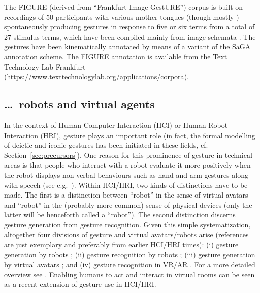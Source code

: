 \documentclass[output=paper,biblatex,babelshorthands,newtxmath,draftmode,colorlinks,citecolor=brown]{langscibook}
\begin{document}
The FIGURE (derived from \enquote{Frankfurt Image GestURE}) corpus \citep{Luecking:Mehler:Walther:Mauri:Kurfuerst:2016} is built on recordings of 50 participants with various mother tongues (though mostly ) spontaneously producing gestures in response to five or six terms from a total of 27 stimulus terms, which have been compiled mainly from image schemata \citep[]{Lakoff87a-u}.
%
The gestures have been kinematically annotated by means of a variant of the SaGA annotation scheme.
%
The FIGURE annotation is available from the Text Technology Lab Frankfurt (\url{https://www.texttechnologylab.org/applications/corpora}).



\subsection{\ldots\ robots and virtual agents}
\label{sec:virtual-agents}

\largerpage
In the context of Human-Computer Interaction (HCI) or Human-Robot Interaction (HRI), gesture plays an important role (in fact, the formal modelling of deictic and iconic gestures has been initiated in these fields, cf. Section~\ref{sec:precursors}).
%
One reason for this prominence of gesture in technical areas is that people who interact with a robot evaluate it more positively when the robot displays non-verbal behaviours such as hand and arm gestures along with speech (see e.g.\ \citealt{Salem:et:al:2012}).
%
Within HCI/HRI, two kinds of distinctions have to be made. 
%
The first is a distinction between \enquote{robot} in the sense of virtual avatars and \enquote{robot} in the (probably more common) sense of physical devices (only the latter will be henceforth called a \enquote{robot}).
%
The second distinction discerns gesture generation from gesture recognition.
%
Given this simple systematization, altogether four divisions of gesture and virtual avatars/robots arise (references are just exemplary and preferably from earlier HCI/HRI times):
%
(i) gesture generation by robots \citep[e.g.][]{Le:et:al:2011};
%
(ii) gesture recognition by robots \citep[e.g.][]{Triesch:vanDerMalsburg:1998};
%
(iii) gesture generation by virtual avatars \citep[e.g.][]{Cassell:Stone:Yan:2000};
%
and (iv) gesture recognition in VR/AR \citep[e.g.][]{Weissmann:Salomon:1999}.
%
For a more detailed overview see \citet{Luecking:Pfeiffer:2012}.
%
Enabling humans to act and interact in virtual rooms \citep[e.g.][]{Pfeiffer:et:al:2018} can be seen as a recent extension of gesture use in HCI/HRI.
\end{document}
